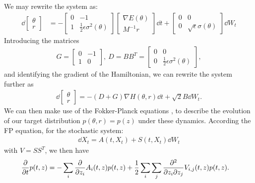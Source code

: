 We may rewrite the system  as:
\begin{align*}
    \dd{\begin{bmatrix}\theta \\ r \end{bmatrix}} &= 
    -\begin{bmatrix}
        0 & -1 \\ 
        1 & \frac{1}{2}\epsilon\sigma^2(\theta)
    \end{bmatrix} \begin{bmatrix}
        \nabla{E}(\theta)  \\ M^{-1}r
    \end{bmatrix}\dd{t} + \begin{bmatrix}
        0 & 0 \\ 
        0 & \sqrt{\epsilon}\sigma(\theta)
    \end{bmatrix} \dd{W_t} 
\end{align*}
Introducing the matrices
\begin{align} \label{eq:stoch-hmc-matrix-defs}
    G=\begin{bmatrix}0 & -1 \\ 1 & 0 \end{bmatrix}, ~D = BB^T= \begin{bmatrix}
        0 & 0 \\ 
        0 & \frac{1}{2}\epsilon\sigma^2(\theta)
    \end{bmatrix},
\end{align}
and identifying the gradient of the Hamiltonian, we can rewrite the system further as 
\begin{align}
    \dd{\begin{bmatrix}\theta \\ r\end{bmatrix}}= - (D+G) \nabla H(\theta, r)\dd{t} + \sqrt{2}B \dd{W_t}.
\end{align}
We can then make use of the Fokker-Planck equations \cite{ottinger_stochastic_1996}, to describe the evolution of our target distribution $p(\theta, r)=p(z)$ under these dynamics. According the FP equation, for the stochastic system:
\begin{align}
    \dd{X_t} =A(t, X_t) + S(t, X_t)\dd{W_t}
\end{align}
with $V=SS^T$, we then have
\begin{align*}
    \pdv{t} p(t, z) &= - \sum_{i} \pdv{z_i} A_i(t, z) p(t, z) 
        + \frac{1}{2}\sum_{i}\sum_{j}\pdv{}{z_i}{z_j}V_{i,j}(t, z)p(t, z). 
\end{align*}
